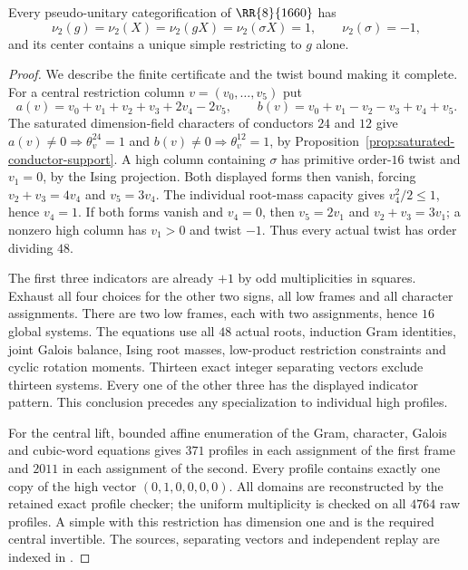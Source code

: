 \begin{proposition}
\label{prop:1660-uniform-indicators}
Every pseudo-unitary categorification of $\RR{8}{1660}$ has
\[
 \nu_2(g)=\nu_2(X)=\nu_2(gX)=\nu_2(\sigma X)=1,
 \qquad\nu_2(\sigma)=-1,
\]
and its center contains a unique simple restricting to $g$ alone.
\end{proposition}
\begin{proof}
We describe the finite certificate and the twist bound making it complete.
For a central restriction column $v=(v_0,\ldots,v_5)$ put
\[
 a(v)=v_0+v_1+v_2+v_3+2v_4-2v_5,
 \qquad b(v)=v_0+v_1-v_2-v_3+v_4+v_5.
\]
The saturated dimension-field characters of conductors $24$ and $12$
give $a(v)\ne0\Rightarrow\theta_v^{24}=1$ and
$b(v)\ne0\Rightarrow\theta_v^{12}=1$, by
Proposition~\ref{prop:saturated-conductor-support}.
A high column containing $\sigma$ has primitive order-$16$ twist and
$v_1=0$, by the Ising projection. Both displayed forms then vanish,
forcing $v_2+v_3=4v_4$ and $v_5=3v_4$.
The individual root-mass capacity gives $v_4^2/2\le1$, hence $v_4=1$.
If both forms vanish and $v_4=0$, then $v_5=2v_1$ and
$v_2+v_3=3v_1$; a nonzero high column has $v_1>0$ and twist $-1$.
Thus every actual twist has order dividing $48$.

The first three indicators are already $+1$ by odd multiplicities in
squares. Exhaust all four choices for the other two signs, all low
frames and all character assignments. There are two low frames, each
with two assignments, hence $16$ global systems. The equations use all
$48$ actual roots, induction Gram identities, joint Galois balance,
Ising root masses, low-product restriction constraints and cyclic
rotation moments. Thirteen exact integer separating vectors exclude
thirteen systems. Every one of the other three has the displayed
indicator pattern. This conclusion precedes any specialization to
individual high profiles.

For the central lift, bounded affine enumeration of the Gram, character,
Galois and cubic-word equations gives $371$ profiles in each assignment
of the first frame and $2011$ in each assignment of the second.
Every profile contains exactly one copy of the high vector
$(0,1,0,0,0,0)$. All domains are reconstructed by the retained exact
profile checker; the uniform multiplicity is checked on all $4764$
raw profiles. A simple with this restriction has dimension one and is
the required central invertible. The sources, separating vectors and
independent replay are indexed in
.
\end{proof}

